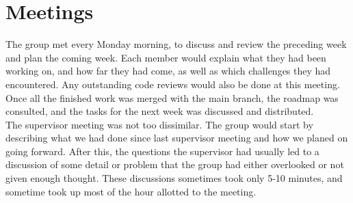\section{Meetings}

The group met every Monday morning, to discuss and review the preceding week and plan the coming week. Each member would explain what they had been working on, and how far they had come, as well as which challenges they had encountered. Any outstanding code reviews would also be done at this meeting. Once all the finished work was merged with the main branch, the roadmap was consulted, and the tasks for the next week was discussed and distributed.\\

The supervisor meeting was not too dissimilar. The group would start by describing what we had done since last supervisor meeting and how we planed on going forward. After this, the questions the supervisor had usually led to a discussion of some detail or problem that the group had either overlooked or not given enough thought. These discussions  sometimes took only 5-10 minutes, and sometime took up most of the hour allotted to the meeting.
